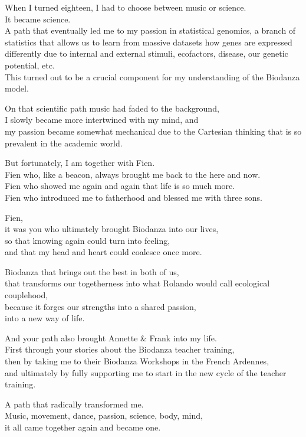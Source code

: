 \documentclass[
  11pt,
]{book}
\begin{document}
When I turned eighteen, I had to choose between music or science.\\
It became science.\\
A path that eventually led me to my passion in statistical genomics, a branch of statistics that allows us to learn from massive datasets how genes are expressed differently due to internal and external stimuli, ecofactors, disease, our genetic potential, etc.\\
This turned out to be a crucial component for my understanding of the Biodanza model.

On that scientific path music had faded to the background,\\
I slowly became more intertwined with my mind, and\\
my passion became somewhat mechanical due to the Cartesian thinking that is so prevalent in the academic world.

But fortunately, I am together with Fien.\\
Fien who, like a beacon, always brought me back to the here and now.\\
Fien who showed me again and again that life is so much more.\\
Fien who introduced me to fatherhood and blessed me with three sons.

Fien,\\
it was you who ultimately brought Biodanza into our lives,\\
so that knowing again could turn into feeling,\\
and that my head and heart could coalesce once more.

Biodanza that brings out the best in both of us,\\
that transforms our togetherness into what Rolando would call ecological couplehood,\\
because it forges our strengths into a shared passion,\\
into a new way of life.

And your path also brought Annette \& Frank into my life.\\
First through your stories about the Biodanza teacher training,\\
then by taking me to their Biodanza Workshops in the French Ardennes,\\
and ultimately by fully supporting me to start in the new cycle of the teacher training.

A path that radically transformed me.\\
Music, movement, dance, passion, science, body, mind,\\
it all came together again and became one.
\end{document}
